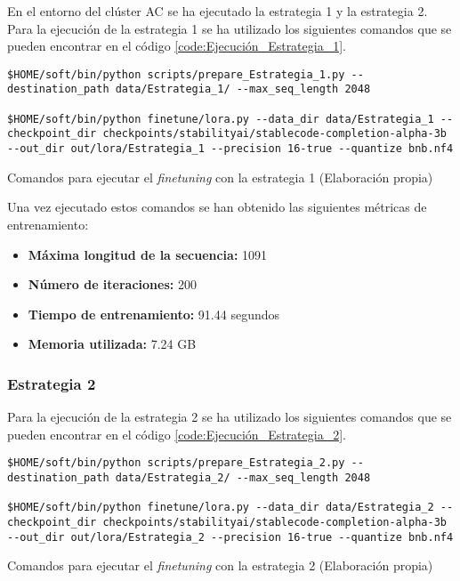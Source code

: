 En el entorno del clúster AC se ha ejecutado la estrategia 1 y la estrategia 2. Para la
ejecución de la estrategia 1 se ha utilizado los siguientes comandos que se pueden encontrar
en el código \ref{code:Ejecución_Estrategia_1}.

\begin{mycode}
    \begin{verbatim}
$HOME/soft/bin/python scripts/prepare_Estrategia_1.py --destination_path data/Estrategia_1/ --max_seq_length 2048

$HOME/soft/bin/python finetune/lora.py --data_dir data/Estrategia_1 --checkpoint_dir checkpoints/stabilityai/stablecode-completion-alpha-3b --out_dir out/lora/Estrategia_1 --precision 16-true --quantize bnb.nf4
    \end{verbatim}
    \caption[Comandos para ejecutar el \textit{finetuning} con la estrategia 1]{Comandos para ejecutar el \textit{finetuning} con la estrategia 1 (Elaboración propia)}
    \label{code:Ejecución_Estrategia_1}
\end{mycode}

Una vez ejecutado estos comandos se han obtenido las siguientes métricas de entrenamiento:

\begin{itemize}
    \item \textbf{Máxima longitud de la secuencia:} 1091
    \item \textbf{Número de iteraciones:} 200
    \item \textbf{Tiempo de entrenamiento:} 91.44 segundos
    \item \textbf{Memoria utilizada:} 7.24 GB
\end{itemize}

\subsubsection{Estrategia 2}
\label{subsubsec:cluster_ac_ejecucion:estrategia_2}


Para la ejecución de la estrategia 2 se ha utilizado los siguientes comandos que se
pueden encontrar en el código \ref{code:Ejecución_Estrategia_2}.

\begin{mycode}
    \begin{verbatim}
$HOME/soft/bin/python scripts/prepare_Estrategia_2.py --destination_path data/Estrategia_2/ --max_seq_length 2048

$HOME/soft/bin/python finetune/lora.py --data_dir data/Estrategia_2 --checkpoint_dir checkpoints/stabilityai/stablecode-completion-alpha-3b --out_dir out/lora/Estrategia_2 --precision 16-true --quantize bnb.nf4
\end{verbatim}
    \caption[Comandos para ejecutar el \textit{finetuning} con la estrategia 2]{Comandos para ejecutar el \textit{finetuning} con la estrategia 2 (Elaboración propia)}
    \label{code:Ejecución_Estrategia_2}
\end{mycode}

